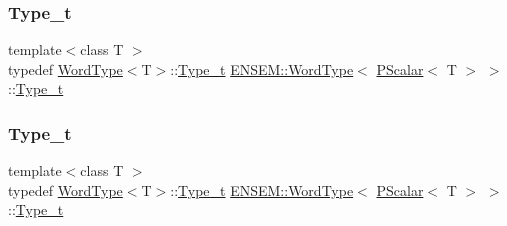 \subsubsection{\texorpdfstring{Type\_t}{Type\_t}\hspace{0.1cm}{\footnotesize\ttfamily [1/3]}}
{\footnotesize\ttfamily template$<$class T $>$ \\
typedef \mbox{\hyperlink{structENSEM_1_1WordType}{Word\+Type}}$<$T$>$\+::\mbox{\hyperlink{structENSEM_1_1WordType_3_01PScalar_3_01T_01_4_01_4_a18e643a2710c1d27fed12cd1c6b2bfaf}{Type\+\_\+t}} \mbox{\hyperlink{structENSEM_1_1WordType}{E\+N\+S\+E\+M\+::\+Word\+Type}}$<$ \mbox{\hyperlink{classENSEM_1_1PScalar}{P\+Scalar}}$<$ T $>$ $>$\+::\mbox{\hyperlink{structENSEM_1_1WordType_3_01PScalar_3_01T_01_4_01_4_a18e643a2710c1d27fed12cd1c6b2bfaf}{Type\+\_\+t}}}

\mbox{\label{structENSEM_1_1WordType_3_01PScalar_3_01T_01_4_01_4_a18e643a2710c1d27fed12cd1c6b2bfaf}} 
\subsubsection{\texorpdfstring{Type\_t}{Type\_t}\hspace{0.1cm}{\footnotesize\ttfamily [2/3]}}
{\footnotesize\ttfamily template$<$class T $>$ \\
typedef \mbox{\hyperlink{structENSEM_1_1WordType}{Word\+Type}}$<$T$>$\+::\mbox{\hyperlink{structENSEM_1_1WordType_3_01PScalar_3_01T_01_4_01_4_a18e643a2710c1d27fed12cd1c6b2bfaf}{Type\+\_\+t}} \mbox{\hyperlink{structENSEM_1_1WordType}{E\+N\+S\+E\+M\+::\+Word\+Type}}$<$ \mbox{\hyperlink{classENSEM_1_1PScalar}{P\+Scalar}}$<$ T $>$ $>$\+::\mbox{\hyperlink{structENSEM_1_1WordType_3_01PScalar_3_01T_01_4_01_4_a18e643a2710c1d27fed12cd1c6b2bfaf}{Type\+\_\+t}}}

\mbox{\label{structENSEM_1_1WordType_3_01PScalar_3_01T_01_4_01_4_a18e643a2710c1d27fed12cd1c6b2bfaf}} 

